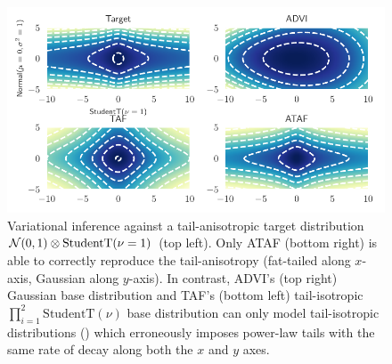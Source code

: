 \documentclass[twoside]{article}
\theoremstyle{definition}
\theoremstyle{remark}
\begin{document}
\begin{figure}[htbp]
  \centering
  \includegraphics{../Figures/pancake.pdf}
    \vspace{-3mm}
  \caption{
    Variational inference against a tail-anisotropic target distribution $\mathcal{N}(0,1) \otimes \text{StudentT}(\nu=1)$ (top left).
    Only ATAF (bottom right) is able to correctly reproduce the tail-anisotropy (fat-tailed along $x$-axis,
    Gaussian along $y$-axis).
    In contrast, ADVI's (top right) Gaussian base distribution and TAF's (bottom left) tail-isotropic $\prod_{i=1}^2 \text{StudentT}(\nu)$
    base distribution  can only model tail-isotropic distributions ()
    which erroneously imposes power-law tails with the same rate of decay along both the $x$ and $y$ axes.
    \vspace{-5mm}
  }
  \label{fig:pancake}
\end{figure}
\end{document}
